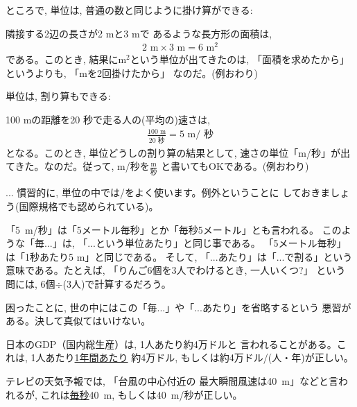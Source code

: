 ところで, 単位は, 普通の数と同じように掛け算ができる:

\begin{exmpl} 隣接する2辺の長さが2 mと3 mで
あるような長方形の面積は, 
\begin{eqnarray}
2\text{ m}\times3\text{ m}=6\text{  m}^2\label{eq:rect_area00}
\end{eqnarray}
である。このとき, 結果にm$^2$という単位が出てきたのは, 
「面積を求めたから」というよりも, 「mを2回掛けたから」
なのだ。(例おわり)\end{exmpl}

単位は, 割り算もできる:

\begin{exmpl} 100 mの距離を20 秒で走る人の(平均の)速さは, 
\begin{eqnarray}
\frac{100\text{ m}}{20\text{ 秒}}=5 \text{ m}/\text{ 秒}\label{eq:100m20s_speed}
\end{eqnarray}
となる。このとき, 単位どうしの割り算の結果として, 
速さの単位「m/秒」が出てきた。なのだ。従って, m/秒を$\frac{\text{m}}{\text{秒}}$
と書いてもOKである。(例おわり)\end{exmpl}

\begin{faq}{\small{} ... 
慣習的に, 単位の中では/をよく使います。例外ということに
しておきましょう(国際規格でも認められている)。}\end{faq}

「5~m/秒」は「5メートル毎秒」とか「毎秒5メートル」とも言われる。
このような「毎...」は, 「...という単位あたり」と同じ事である。
「5メートル毎秒」は「1秒あたり5 m」と同じである。
そして, 「...あたり」は「...で割る」という意味である。たとえば, 
「りんご6個を3人でわけるとき, 一人いくつ?」
という問には, 6個$\div$(3人)で計算するだろう。

困ったことに, 世の中にはこの「毎...」や「...あたり」を省略するという
悪習がある。決して真似てはいけない。

\begin{exmpl} 日本のGDP（国内総生産）は, 1人あたり約4万ドルと
言われることがある。これは, 1人あたり\underline{1年間あたり}
約4万ドル, もしくは約4万ドル/(人・年)が正しい。\end{exmpl}

\begin{exmpl} テレビの天気予報では, 「台風の中心付近の
最大瞬間風速は40~m」などと言われるが, これは\underline{毎秒}40~m, 
もしくは40~m/秒が正しい。\end{exmpl}

